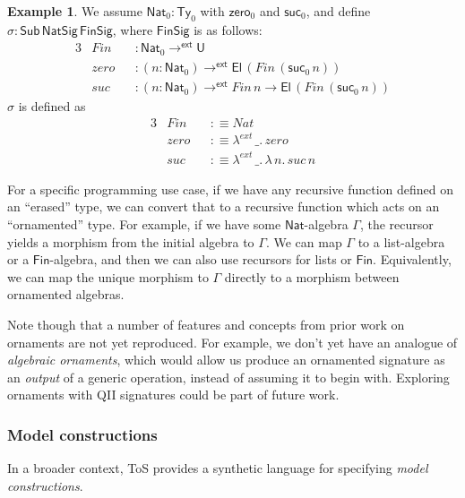 \documentclass[12pt,a4paper,twoside,openany]{book}
\theoremstyle{remark}
\theoremstyle{definition}
\newtheorem{myexample}{Example}
\theoremstyle{theorem}
\newcommand{\mi}[1]{\mathit{#1}}
\newcommand{\ms}[1]{\mathsf{#1}}
\newcommand{\zero}{\ms{zero}}
\newcommand{\suc}{\ms{suc}}
\newcommand{\Sub}{\mathsf{Sub}}
\newcommand{\Ty}{\mathsf{Ty}}
\newcommand{\U}{\mathsf{U}}
\newcommand{\El}{\mathsf{El}}
\newcommand{\toe}{\to^{\ms{ext}}}
\newcommand{\Nat}{\ms{Nat}}
\newcommand{\defn}{:\equiv}
\begin{document}
\begin{myexample}
  We assume $\Nat_0 : \Ty_0$ with $\zero_0$ and $\suc_0$, and define $\sigma : \Sub\,\ms{NatSig}\,\ms{FinSig}$, where $\ms{FinSig}$ is as follows:
\begin{alignat*}{3}
  &\mi{Fin}  &&: \Nat_0 \toe \U\\
  &\mi{zero} &&: (n : \Nat_0) \toe \El\,(\mi{Fin}\,(\suc_0\,n))\\
  &\mi{suc}  &&: (n : \Nat_0) \toe \mi{Fin}\,n \to \El\,(\mi{Fin}\,(\suc_0\,n))
\end{alignat*}
$\sigma$ is defined as
\begin{alignat*}{3}
  &\mi{Fin}  &&\defn \mi{Nat}\\
  &\mi{zero} &&\defn \lambda^{ext}\,\_.\,\mi{zero}\\
  &\mi{suc}  &&\defn \lambda^{ext}\,\_.\,\lambda\,n.\,\mi{suc}\,n
\end{alignat*}
\end{myexample}
For a specific programming use case, if we have any recursive function defined
on an ``erased'' type, we can convert that to a recursive function which acts on
an ``ornamented'' type. For example, if we have some $\Nat$-algebra $\Gamma$,
the recursor yields a morphism from the initial algebra to $\Gamma$. We can map
$\Gamma$ to a list-algebra or a $\ms{Fin}$-algebra, and then we can also use
recursors for lists or $\ms{Fin}$. Equivalently, we can map the unique morphism
to $\Gamma$ directly to a morphism between ornamented algebras.

Note though that a number of features and concepts from prior work on ornaments
are not yet reproduced. For example, we don't yet have an analogue of
\emph{algebraic ornaments}, which would allow us produce an ornamented signature
as an \emph{output} of a generic operation, instead of assuming it to begin
with. Exploring ornaments with QII signatures could be part of future work.

\subsubsection{Model constructions}

In a broader context, ToS provides a synthetic language for specifying
\emph{model constructions}.
\end{document}
